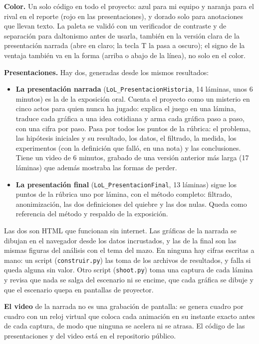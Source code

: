 \documentclass[11pt,letterpaper]{article}
\begin{document}
\noindent\textbf{Color.} Un solo código en todo el proyecto: azul para mi equipo y
naranja para el rival en el reporte (rojo en las presentaciones), y
dorado solo para anotaciones que llevan texto. La paleta se validó con un verificador de
contraste y de separación para daltonismo antes de usarla, también en la versión clara de la
presentación narrada (abre en claro; la tecla T la pasa a oscuro); el signo de la ventaja
también va en la forma (arriba o abajo de la línea), no solo en el color.

\noindent\textbf{Presentaciones.} Hay dos, generadas desde los mismos resultados:
\begin{itemize}[leftmargin=1.4em,itemsep=.25em]
  \item \textbf{La presentación narrada} (\texttt{LoL\_PresentacionHistoria}, 14
        láminas, unos 6 minutos) es la de la exposición oral. Cuenta el proyecto como un
        misterio en cinco actos para quien nunca ha jugado: explica el juego en una
        lámina, traduce cada gráfica a una idea cotidiana y arma cada gráfica paso a
        paso, con una cifra por paso. Pasa por todos los puntos de la rúbrica: el problema,
        las hipótesis iniciales y su resultado, los datos, el filtrado, la medida, los
        experimentos (con la definición que falló, en una nota) y las conclusiones. Tiene un
        video de 6 minutos, grabado de una versión anterior más larga (17 láminas) que
        además mostraba las formas de perder.
  \item \textbf{La presentación final} (\texttt{LoL\_PresentacionFinal}, 13 láminas)
        sigue los puntos de la rúbrica uno por lámina, con el método completo: filtrado,
        anonimización, las dos definiciones del quiebre y las dos nulas. Queda como
        referencia del método y respaldo de la exposición.
\end{itemize}
Las dos son HTML que funcionan sin internet. Las gráficas de la narrada se dibujan en el
navegador desde los datos incrustados, y las de la final son las mismas figuras del
análisis con el tema del mazo. En ninguna hay cifras escritas a mano: un script
(\texttt{construir.py}) las toma de los archivos de resultados, y falla si queda alguna
sin valor. Otro script (\texttt{shoot.py}) toma una captura de cada lámina y revisa que
nada se salga del escenario ni se encime, que cada gráfica se dibuje y que el escenario
quepa en pantallas de proyector.

\noindent\textbf{El video} de la narrada no es una grabación de pantalla: se genera
cuadro por cuadro con un reloj virtual que coloca cada animación en su instante exacto
antes de cada captura, de modo que ninguna se acelera ni se atrasa. El código de las
presentaciones y del video está en el repositorio público.
\end{document}
